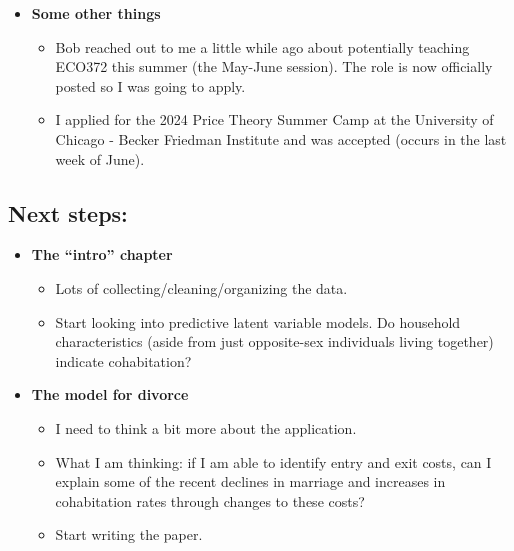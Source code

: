\documentclass{article}
\begin{document}
\begin{itemize}
\item \textbf{Some other things}
\begin{itemize}
\item Bob reached out to me a little while ago about potentially teaching ECO372 this summer (the May-June session). The role is now officially posted so I was going to apply.
\item I applied for the 2024 Price Theory Summer Camp at the University of Chicago - Becker Friedman Institute and was accepted (occurs in the last week of June).
\end{itemize}



\end{itemize}

\subsection*{Next steps:}
\begin{itemize}
\item \textbf{The ``intro'' chapter}
\begin{itemize}
\item Lots of collecting/cleaning/organizing the data.
\item Start looking into predictive latent variable models. Do household characteristics (aside from just opposite-sex individuals living together) indicate cohabitation?
\end{itemize}
\item \textbf{The model for divorce}
\begin{itemize}
\item I need to think a bit more about the application. 
\item What I am thinking: if I am able to identify entry and exit costs, can I explain some of the recent declines in marriage and increases in cohabitation rates through changes to these costs?
\item Start writing the paper.

\end{itemize}
\end{itemize}

\newpage

%
\end{document}
